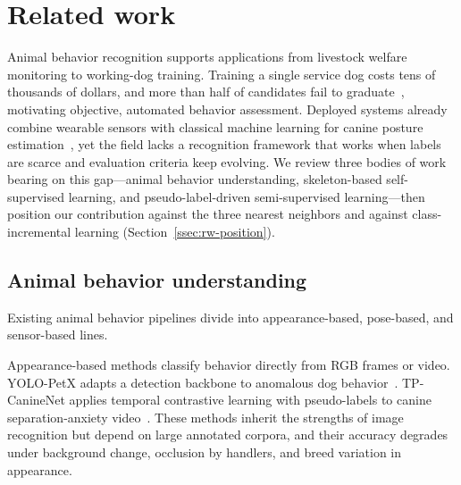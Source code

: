 
\section{Related work}\label{sec:related}

Animal behavior recognition supports applications from livestock welfare monitoring to working-dog training. Training a single service dog costs tens of thousands of dollars, and more than half of candidates fail to graduate~\citep{grimm2026science}, motivating objective, automated behavior assessment. Deployed systems already combine wearable sensors with classical machine learning for canine posture estimation~\citep{plosone2023imu}, yet the field lacks a recognition framework that works when labels are scarce and evaluation criteria keep evolving. We review three bodies of work bearing on this gap---animal behavior understanding, skeleton-based self-supervised learning, and pseudo-label-driven semi-supervised learning---then position our contribution against the three nearest neighbors and against class-incremental learning (Section~\ref{ssec:rw-position}).

\subsection{Animal behavior understanding}\label{ssec:rw-animal}

Existing animal behavior pipelines divide into appearance-based, pose-based, and sensor-based lines.

Appearance-based methods classify behavior directly from RGB frames or video. YOLO-PetX adapts a detection backbone to anomalous dog behavior~\citep{yolo2025petx}. TP-CanineNet applies temporal contrastive learning with pseudo-labels to canine separation-anxiety video~\citep{tpcanine2025}. These methods inherit the strengths of image recognition but depend on large annotated corpora, and their accuracy degrades under background change, occlusion by handlers, and breed variation in appearance.

